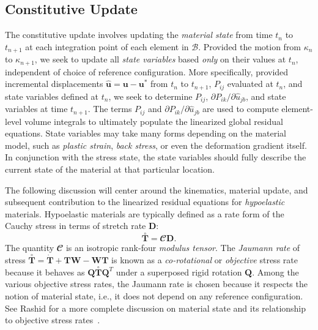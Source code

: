 \subsection{Constitutive Update}

The constitutive update involves updating the \textit{material state} from time $t_n$ to $t_{n+1}$ at each integration point of each element in $\mathcal{B}$. Provided the motion from $\kappa_n$ to $\kappa_{n+1}$, we seek to update all \textit{state variables} based \textit{only} on their values at $t_n$, independent of choice of reference configuration. More specifically, provided incremental displacements $\hat{\bm{u}} = \bm{u} - \bm{u}^*$ from $t_n$ to $t_{n+1}$, $P_{ij}$ evaluated at $t_n$, and state variables defined at $t_n$, we seek to determine $P_{ij}$, $\partial{P_{ik}}/\partial{\hat{u}_{jb}}$, and state variables at time $t_{n+1}$. The terms $P_{ij}$ and $\partial{P_{ik}}/\partial{\hat{u}_{jb}}$ are used to compute element-level volume integrals to ultimately populate the linearized global residual equations. State variables may take many forms depending on the material model, such as \textit{plastic strain}, \textit{back stress}, or even the deformation gradient itself. In conjunction with the stress state, the state variables should fully describe the current state of the material at that particular location.

The following discussion will center around the kinematics, material update, and subsequent contribution to the linearized residual equations for \textit{hypoelastic} materials. Hypoelastic materials are typically defined as a rate form of the Cauchy stress in terms of stretch rate $\bm{D}$:
\begin{equation}
\overset{\circ}{\bm{T}} =  {\mathbfcal{C}}\bm{D}.
\end{equation}
The quantity ${\mathbfcal{C}}$ is an isotropic rank-four \textit{modulus tensor}. The \textit{Jaumann rate} of stress $\overset{\circ}{\bm{T}} = \dot{\bm{T}} + \bm{T}\bm{W} - \bm{W}\bm{T}$ is known as a \textit{co-rotational} or \textit{objective} stress rate because it behaves as $\bm{Q}\overset{\circ}{\bm{T}}\bm{Q}^T$ under a superposed rigid rotation $\bm{Q}$. Among the various objective stress rates, the Jaumann rate is chosen because it respects the notion of material state, i.e., it does not depend on any reference configuration. See Rashid for a more complete discussion on material state and its relationship to objective stress rates~\cite{rashid_1991}.

